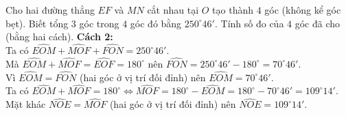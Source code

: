 \begin{bt}%
Cho hai đường thẳng $EF$ và $MN$ cắt nhau tại $O$ tạo thành $4$ góc (không kể góc bẹt). Biết tổng $3$ góc trong $4$ góc đó bằng $250^{\circ}46'$. Tính số đo của $4$ góc đã cho (bằng hai cách).
\loigiai
{
	\noindent \textbf{Cách 2:}\\
	Ta có $\widehat{EOM}+\widehat{MOF}+\widehat{FON}=250^{\circ}46'$.\\
	Mà $\widehat{EOM}+\widehat{MOF}=\widehat{EOF}=180^\circ$ nên $\widehat{FON}=250^\circ46'-180^\circ=70^\circ46'$.\\
	Vì $\widehat{EOM}=\widehat{FON}$ (hai góc ở vị trí đối đỉnh) nên $\widehat{EOM}=70^\circ46'$.\\
	Ta có $\widehat{EOM}+\widehat{MOF}=180^\circ \Leftrightarrow \widehat{MOF}=180^\circ-\widehat{EOM}=180^\circ-70^\circ46'=109^\circ14'$.\\
	Mặt khác $\widehat{NOE}=\widehat{MOF}$ (hai góc ở vị trí đối đỉnh) nên $\widehat{NOE}=109^\circ14'$.
}
\end{bt}

